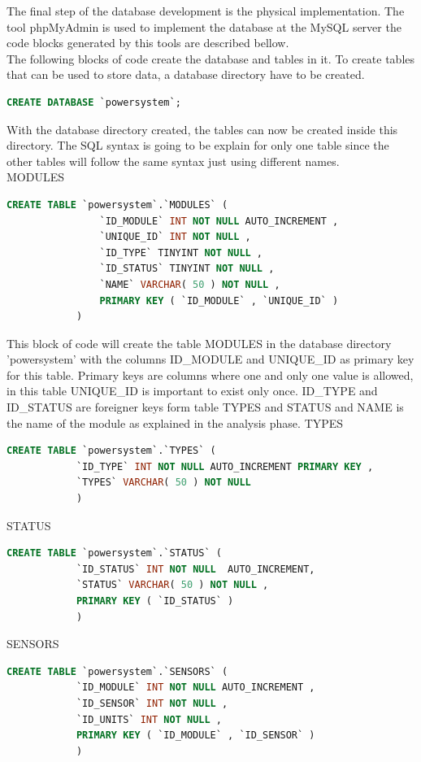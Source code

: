 The final step of the database development is the physical implementation. The tool phpMyAdmin is used to implement the database at the MySQL server the code blocks generated by this tools are described bellow. 
\\
The following blocks of code create the database and tables in it.
To create tables that can be used to store data, a database directory have to be created.
		\begin{lstlisting}[language=sql, stepnumber=0, tabsize=1]
			CREATE DATABASE `powersystem`;
		\end{lstlisting}
		With the database directory created, the tables can now be created inside this directory.
The SQL syntax is going to be explain for only one table since the other tables will follow the same syntax just using different names.\\
		MODULES
		\begin{lstlisting}[language=sql, stepnumber=0, tabsize=1]
			CREATE TABLE `powersystem`.`MODULES` (
				`ID_MODULE` INT NOT NULL AUTO_INCREMENT ,
				`UNIQUE_ID` INT NOT NULL ,
				`ID_TYPE` TINYINT NOT NULL ,
				`ID_STATUS` TINYINT NOT NULL ,
				`NAME` VARCHAR( 50 ) NOT NULL ,
				PRIMARY KEY ( `ID_MODULE` , `UNIQUE_ID` )
			) 
		\end{lstlisting}
		This block of code will create the table MODULES in the database directory 'powersystem' with the columns ID\_MODULE and UNIQUE\_ID as primary key for this table. Primary keys are columns where one and only one value is allowed, in this table UNIQUE\_ID is important to exist only once. 
		ID\_TYPE and ID\_STATUS are foreigner keys form table TYPES and STATUS and NAME is the name of the module as explained in the analysis phase.
		TYPES
		\begin{lstlisting}[language=sql, stepnumber=0, tabsize=1]
			CREATE TABLE `powersystem`.`TYPES` (
			`ID_TYPE` INT NOT NULL AUTO_INCREMENT PRIMARY KEY ,
			`TYPES` VARCHAR( 50 ) NOT NULL
			)
		\end{lstlisting}
		STATUS
		\begin{lstlisting}[language=sql, stepnumber=0, tabsize=1]
			CREATE TABLE `powersystem`.`STATUS` (
			`ID_STATUS` INT NOT NULL  AUTO_INCREMENT,
			`STATUS` VARCHAR( 50 ) NOT NULL ,
			PRIMARY KEY ( `ID_STATUS` )
			)
		\end{lstlisting}	
		SENSORS
		\begin{lstlisting}[language=sql, stepnumber=0, tabsize=1]
			CREATE TABLE `powersystem`.`SENSORS` (
			`ID_MODULE` INT NOT NULL AUTO_INCREMENT ,
			`ID_SENSOR` INT NOT NULL ,
			`ID_UNITS` INT NOT NULL ,
			PRIMARY KEY ( `ID_MODULE` , `ID_SENSOR` )
			)
		\end{lstlisting}
